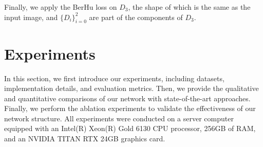 \documentclass[letterpaper]{article} \usepackage{aaai21}  \usepackage{times}  \usepackage{helvet} \usepackage{courier}  \usepackage[hyphens]{url}  \usepackage{graphicx} \urlstyle{rm} \def\UrlFont{\rm}  \usepackage{natbib}  \usepackage{caption} \frenchspacing  \setlength{\pdfpagewidth}{8.5in}  \setlength{\pdfpageheight}{11in}
\begin{document}
Finally, we apply the BerHu loss on $D_3$, the shape of which is the same as the input image, and $\{D_i\}_{i=0}^2$ are part of the components of $D_3$.


\section{Experiments}
In this section, we first introduce our experiments, including datasets, implementation details, and evaluation metrics. Then, we provide the qualitative and quantitative comparisons of our network with state-of-the-art approaches.
Finally, we perform the ablation experiments to validate the effectiveness of our network structure.
All experiments were conducted on a server computer equipped with an Intel(R) Xeon(R) Gold 6130 CPU processor, 256GB of RAM, and an NVIDIA TITAN RTX 24GB graphics card.
\end{document}
